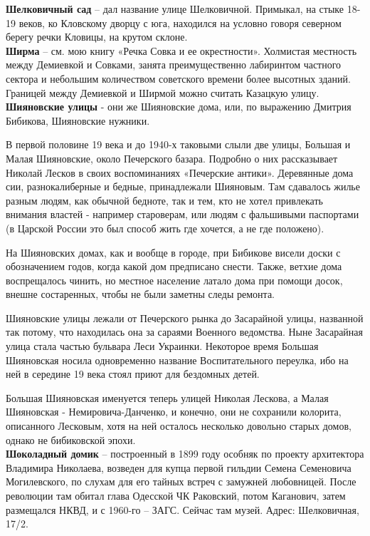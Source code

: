 \textbf{Шелковичный сад} – дал название улице Шелковичной. Примыкал, на стыке 18-19 веков, ко Кловскому дворцу с юга, находился на условно говоря северном берегу речки Кловицы, на крутом склоне.\\

\textbf{Ширма} – см. мою книгу «Речка Совка и ее окрестности». Холмистая местность между Демиевкой и Совками, занята преимущественно лабиринтом частного сектора и небольшим количеством советского времени более высотных зданий. Границей между Демиевкой и Ширмой можно считать Казацкую улицу.\\

\textbf{Шияновские улицы} - они же Шияновские дома, или, по выражению Дмитрия Бибикова, Шияновские нужники.

В первой половине 19 века и до 1940-х таковыми слыли две улицы, Большая и Малая Шияновские, около Печерского базара. Подробно о них рассказывает Николай Лесков в своих воспоминаниях «Печерские антики». Деревянные дома сии, разнокалиберные и бедные, принадлежали Шияновым. Там сдавалось жилье разным людям, как обычной бедноте, так и тем, кто не хотел привлекать внимания властей - например староверам, или людям с фальшивыми паспортами (в Царской России это был способ жить где хочется, а не где положено).

На Шияновских домах, как и вообще в городе, при Бибикове висели доски с обозначением годов, когда какой дом предписано снести. Также, ветхие дома воспрещалось чинить, но местное население латало дома при помощи досок, внешне состаренных, чтобы не были заметны следы ремонта.

Шияновские улицы лежали от Печерского рынка до Засарайной улицы, названной так потому, что находилась она за сараями Военного ведомства. Ныне Засарайная улица стала частью бульвара Леси Украинки. Некоторое время Большая Шияновская носила одновременно название Воспитательного переулка, ибо на ней в середине 19 века стоял приют для бездомных детей.

Большая Шияновская именуется теперь улицей Николая Лескова, а Малая Шияновская - Немировича-Данченко, и конечно, они не сохранили колорита, описанного Лесковым, хотя на ней осталось несколько довольно старых домов, однако не бибиковской эпохи.\\

\textbf{Шоколадный домик} – построенный в 1899 году особняк по проекту архитектора Владимира Николаева, возведен для купца первой гильдии Семена Семеновича Могилевского, по слухам для его тайных встреч с замужней любовницей. После революции там обитал глава Одесской ЧК Раковский, потом Каганович, затем размещался НКВД, и с 1960-го – ЗАГС. Сейчас там музей. Адрес: Шелковичная, 17/2.\\

